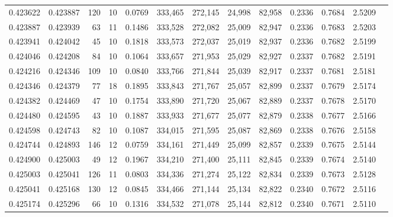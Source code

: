 \begin{tabular}{rrrrrrrrrrrrr}
0.423622 & 0.423887 &   120 &  10 &                                     0.0769 & 333,465 & 272,145 &  24,998 &  82,958 & 0.2336 & 0.7684 & 2.5209 \\
0.423887 & 0.423939 &    63 &  11 &                                     0.1486 & 333,528 & 272,082 &  25,009 &  82,947 & 0.2336 & 0.7683 & 2.5203 \\
0.423941 & 0.424042 &    45 &  10 &                                     0.1818 & 333,573 & 272,037 &  25,019 &  82,937 & 0.2336 & 0.7682 & 2.5199 \\
0.424046 & 0.424208 &    84 &  10 &                                     0.1064 & 333,657 & 271,953 &  25,029 &  82,927 & 0.2337 & 0.7682 & 2.5191 \\
0.424216 & 0.424346 &   109 &  10 &                                     0.0840 & 333,766 & 271,844 &  25,039 &  82,917 & 0.2337 & 0.7681 & 2.5181 \\
0.424346 & 0.424379 &    77 &  18 &                                     0.1895 & 333,843 & 271,767 &  25,057 &  82,899 & 0.2337 & 0.7679 & 2.5174 \\
0.424382 & 0.424469 &    47 &  10 &                                     0.1754 & 333,890 & 271,720 &  25,067 &  82,889 & 0.2337 & 0.7678 & 2.5170 \\
0.424480 & 0.424595 &    43 &  10 &                                     0.1887 & 333,933 & 271,677 &  25,077 &  82,879 & 0.2338 & 0.7677 & 2.5166 \\
0.424598 & 0.424743 &    82 &  10 &                                     0.1087 & 334,015 & 271,595 &  25,087 &  82,869 & 0.2338 & 0.7676 & 2.5158 \\
0.424744 & 0.424893 &   146 &  12 &                                     0.0759 & 334,161 & 271,449 &  25,099 &  82,857 & 0.2339 & 0.7675 & 2.5144 \\
0.424900 & 0.425003 &    49 &  12 &                                     0.1967 & 334,210 & 271,400 &  25,111 &  82,845 & 0.2339 & 0.7674 & 2.5140 \\
0.425003 & 0.425041 &   126 &  11 &                                     0.0803 & 334,336 & 271,274 &  25,122 &  82,834 & 0.2339 & 0.7673 & 2.5128 \\
0.425041 & 0.425168 &   130 &  12 &                                     0.0845 & 334,466 & 271,144 &  25,134 &  82,822 & 0.2340 & 0.7672 & 2.5116 \\
0.425174 & 0.425296 &    66 &  10 &                                     0.1316 & 334,532 & 271,078 &  25,144 &  82,812 & 0.2340 & 0.7671 & 2.5110 \\

\end{tabular}

